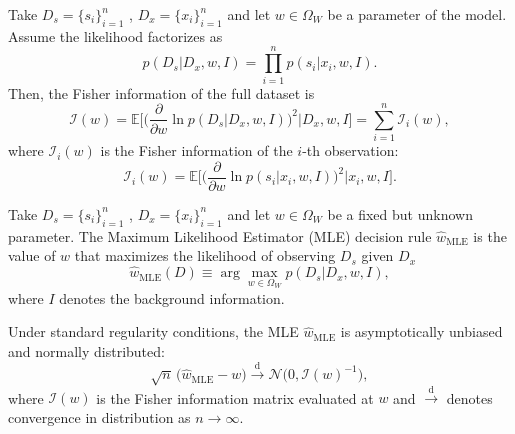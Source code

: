 \begin{theorem}
	\label{thm:fisher_sample}
	Take $D_s= \{s_i\}_{i=1}^n$ , $D_x = \{x_i\}_{i=1}^n$ and let $w \in \Omega_W$ be a parameter of the model. Assume the likelihood factorizes as
	\begin{equation}
		p(D_s | D_x, w, I) = \prod_{i=1}^{n} p(s_i | x_i, w, I).
	\end{equation}
	Then, the Fisher information of the full dataset is
	\begin{equation}
		\mathcal{I}(w) 
		= \mathbb{E}\Bigg[\Big(\frac{\partial}{\partial w} \ln p(D_s | D_x, w, I)\Big)^2 \Bigg| D_x, w, I \Bigg] 
		= \sum_{i=1}^{n} \mathcal{I}_i(w),
	\end{equation}
	where $\mathcal{I}_i(w)$ is the Fisher information of the $i$-th observation:
	\begin{equation}
		\mathcal{I}_i(w) = \mathbb{E}\Bigg[\Big(\frac{\partial}{\partial w} \ln p(s_i | x_i, w, I)\Big)^2 \Bigg| x_i, w, I \Bigg].
	\end{equation}
\end{theorem}


\begin{definition}
	\label{def:MLE}
	Take $D_s= \{s_i\}_{i=1}^n$ , $D_x = \{x_i\}_{i=1}^n$ and let $w \in \Omega_W$ be a fixed but unknown parameter. The Maximum Likelihood Estimator (MLE) decision rule $\hat{w}_{\mathrm{MLE}}$ is the value of $w$ that maximizes the likelihood of observing $D_s$ given $D_x$
	\begin{equation}
		\hat{w}_{\mathrm{MLE}}(D) \equiv \arg \max_{w \in \Omega_W} p(D_s | D_x, w, I),
	\end{equation}
	where $I$ denotes the background information.
\end{definition}


\begin{theorem}
	\label{thm:unbiased_mle}
	Under standard regularity conditions, the MLE $\hat{w}_{\mathrm{MLE}}$ is asymptotically unbiased and normally distributed:
	\begin{equation}
		\sqrt{n}\,\big(\hat{w}_{\mathrm{MLE}} - w\big) \xrightarrow{\text{d}} \mathcal{N}\big(0, \mathcal{I}(w)^{-1}\big),
	\end{equation}
	where $\mathcal{I}(w)$ is the Fisher information matrix evaluated at $w$ and $\xrightarrow{\text{d}}$ denotes convergence in distribution as $n \to \infty$.
\end{theorem}

